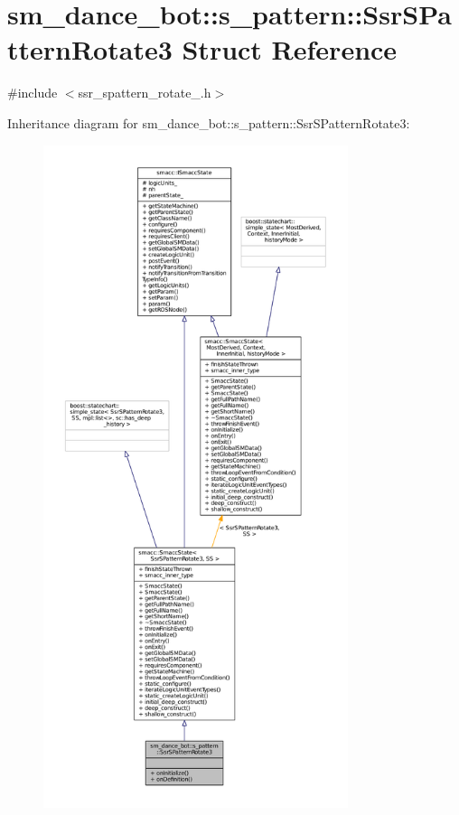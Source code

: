 \hypertarget{structsm__dance__bot_1_1s__pattern_1_1SsrSPatternRotate3}{}\section{sm\+\_\+dance\+\_\+bot\+:\+:s\+\_\+pattern\+:\+:Ssr\+S\+Pattern\+Rotate3 Struct Reference}
\label{structsm__dance__bot_1_1s__pattern_1_1SsrSPatternRotate3}


{\ttfamily \#include $<$ssr\+\_\+spattern\+\_\+rotate\+\_.\+h$>$}



Inheritance diagram for sm\+\_\+dance\+\_\+bot\+:\+:s\+\_\+pattern\+:\+:Ssr\+S\+Pattern\+Rotate3\+:
\nopagebreak
\begin{figure}[H]
\begin{center}
\leavevmode
\includegraphics[height=550pt]{structsm__dance__bot_1_1s__pattern_1_1SsrSPatternRotate3__inherit__graph}
\end{center}
\end{figure}


